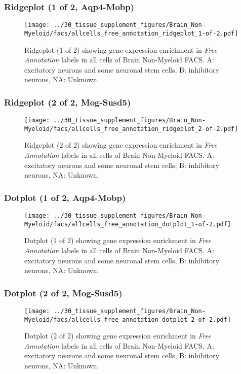 \clearpage

\subsubsection{Ridgeplot (1 of 2, Aqp4-Mobp)}
\begin{figure}[h]
\centering
\texttt{[image: ../30\_tissue\_supplement\_figures/Brain\_Non-Myeloid/facs/allcells\_free\_annotation\_ridgeplot\_1-of-2.pdf]}

\caption{ Ridgeplot (1 of 2)  showing gene expression enrichment in \emph{Free Annotation} labels in all cells of Brain Non-Myeloid FACS. A: excitatory neurons and some neuronal stem cells, B: inhibitory neurons, NA: Unknown.}
\end{figure}


\clearpage

\subsubsection{Ridgeplot (2 of 2, Mog-Susd5)}
\begin{figure}[h]
\centering
\texttt{[image: ../30\_tissue\_supplement\_figures/Brain\_Non-Myeloid/facs/allcells\_free\_annotation\_ridgeplot\_2-of-2.pdf]}

\caption{ Ridgeplot (2 of 2)  showing gene expression enrichment in \emph{Free Annotation} labels in all cells of Brain Non-Myeloid FACS. A: excitatory neurons and some neuronal stem cells, B: inhibitory neurons, NA: Unknown.}
\end{figure}


\clearpage

\subsubsection{Dotplot (1 of 2, Aqp4-Mobp)}
\begin{figure}[h]
\centering
\texttt{[image: ../30\_tissue\_supplement\_figures/Brain\_Non-Myeloid/facs/allcells\_free\_annotation\_dotplot\_1-of-2.pdf]}

\caption{ Dotplot (1 of 2)  showing gene expression enrichment in \emph{Free Annotation} labels in all cells of Brain Non-Myeloid FACS. A: excitatory neurons and some neuronal stem cells, B: inhibitory neurons, NA: Unknown.}
\end{figure}


\clearpage

\subsubsection{Dotplot (2 of 2, Mog-Susd5)}
\begin{figure}[h]
\centering
\texttt{[image: ../30\_tissue\_supplement\_figures/Brain\_Non-Myeloid/facs/allcells\_free\_annotation\_dotplot\_2-of-2.pdf]}

\caption{ Dotplot (2 of 2)  showing gene expression enrichment in \emph{Free Annotation} labels in all cells of Brain Non-Myeloid FACS. A: excitatory neurons and some neuronal stem cells, B: inhibitory neurons, NA: Unknown.}
\end{figure}


